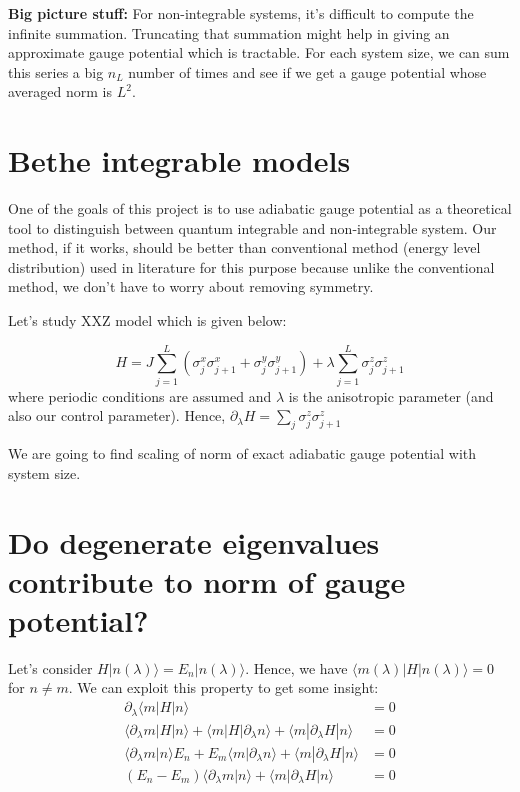\documentclass[11pt,a4paper]{article}
\begin{document}
\textbf{Big picture stuff:} For non-integrable systems, it's difficult to compute the infinite summation. Truncating that summation might help in giving an approximate gauge potential which is tractable. For each system size, we can sum this series a big $n_L$ number of times and see if we get a gauge potential whose averaged norm is $L^2$.

\section{Bethe integrable models}
One of the goals of this project is to use adiabatic gauge potential as a theoretical tool to distinguish  between quantum integrable and non-integrable system. Our method, if it works, should be better than conventional method (energy level distribution) used in literature for this purpose because unlike the conventional method, we don't have to worry about removing symmetry.

Let's study XXZ model which is given below: 

\begin{equation}
H=  J \sum_{j=1}^{L} (\sigma_j^x \sigma_{j+1}^x + \sigma_j^y \sigma_{j+1}^y)+  \lambda \sum_{j=1}^{L}\sigma_j^z \sigma_{j+1}^z
\label{xxz}
\end{equation}
where periodic conditions are assumed and $\lambda$ is the anisotropic parameter (and also our control parameter). Hence, $\partial_{\lambda}H= \sum_{j}\sigma_j^z \sigma_{j+1}^z$

We are going to find scaling of norm of exact adiabatic gauge potential with system size.
\appendix
\section{Do degenerate eigenvalues contribute to norm of gauge potential?}\label{sec.deg}
Let's consider $H | n(\lambda) \rangle= E_n  | n(\lambda) \rangle $. Hence, we have $\langle m(\lambda)  |  H | n(\lambda) \rangle=0$ for $n\neq m$. We can exploit this property to get some insight:
\begin{align*}
\partial_{\lambda}\langle m  |  H | n\rangle&=0\\
\langle \partial_{\lambda} m |  H | n \rangle + \langle  m  |  H |\partial_{\lambda} n \rangle + \langle  m  | \partial_{\lambda} H | n \rangle&=0\\
\langle \partial_{\lambda} m   | n \rangle E_n + E_m\langle  m  |   \partial_{\lambda} n \rangle + \langle  m  | \partial_{\lambda} H | n \rangle&=0\\
(E_n - E_m)\langle  \partial_{\lambda} m  |    n \rangle + \langle  m  | \partial_{\lambda} H | n \rangle&=0
\end{align*}
\end{document}
